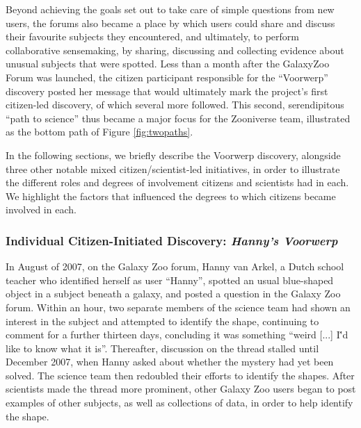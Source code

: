 \documentclass{sigchi}
\begin{document}
Beyond achieving the goals set out to take care of simple questions from new users, the forums also became a place by which users could share and discuss their favourite subjects they encountered, and ultimately, to perform collaborative sensemaking, by sharing, discussing and collecting evidence about unusual subjects that were spotted.  Less than a month after the GalaxyZoo Forum was launched, the citizen participant responsible for the ``Voorwerp'' discovery posted her message that would ultimately mark the project's first citizen-led discovery, of which several more followed.  This second, serendipitous ``path to science'' thus became a major focus for the Zooniverse team, illustrated as the bottom path of Figure \ref{fig:twopaths}. 

In the following sections, we briefly describe the Voorwerp discovery, alongside three other notable mixed citizen/scientist-led initiatives, in order to illustrate the different roles and degrees of involvement  citizens and scientists had in each.  We highlight the factors that influenced the degrees to which citizens became involved in each.


\subsubsection{Individual Citizen-Initiated Discovery: \emph{Hanny's Voorwerp}}
In August of 2007, on the Galaxy Zoo forum, Hanny van Arkel, a Dutch school teacher who identified herself as user ``Hanny'', spotted an usual blue-shaped object in a subject beneath a galaxy, and posted a question in the Galaxy Zoo forum. Within an hour, two separate members of the science team had shown an interest in the subject and attempted to identify the shape, continuing to comment for a further thirteen days, concluding it was something ``weird [...] I\''d like to know what it is''. Thereafter, discussion on the thread stalled until December 2007, when Hanny asked about whether the mystery had yet been solved. The science team then redoubled their efforts to identify the shapes. After scientists made the thread more prominent, other Galaxy Zoo users began to post examples of other subjects, as well as collections of data, in order to help identify the shape. 
\end{document}
